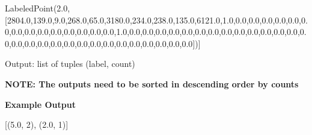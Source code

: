 \documentclass[11pt]{article}
\newenvironment{Shaded}{}{}
\newcommand{\DecValTok}[1]{\textcolor[rgb]{0.25,0.63,0.44}{{#1}}}
\newcommand{\FloatTok}[1]{\textcolor[rgb]{0.25,0.63,0.44}{{#1}}}
\newcommand{\NormalTok}[1]{{#1}}
\begin{document}
\begin{Shaded}
\begin{Highlighting}[]
\NormalTok{ LabeledPoint(}\FloatTok{2.0}\NormalTok{, [}\FloatTok{2804.0}\NormalTok{,}\FloatTok{139.0}\NormalTok{,}\FloatTok{9.0}\NormalTok{,}\FloatTok{268.0}\NormalTok{,}\FloatTok{65.0}\NormalTok{,}\FloatTok{3180.0}\NormalTok{,}\FloatTok{234.0}\NormalTok{,}\FloatTok{238.0}\NormalTok{,}\FloatTok{135.0}\NormalTok{,}\FloatTok{6121.0}\NormalTok{,}\FloatTok{1.0}\NormalTok{,}\FloatTok{0.0}\NormalTok{,}\FloatTok{0.0}\NormalTok{,}\FloatTok{0.0}\NormalTok{,}\FloatTok{0.0}\NormalTok{,}\FloatTok{0.0}\NormalTok{,}\FloatTok{0.0}\NormalTok{,}\FloatTok{0.0}\NormalTok{,}\FloatTok{0.0}\NormalTok{,}\FloatTok{0.0}\NormalTok{,}\FloatTok{0.0}\NormalTok{,}\FloatTok{0.0}\NormalTok{,}\FloatTok{0.0}\NormalTok{,}\FloatTok{0.0}\NormalTok{,}\FloatTok{0.0}\NormalTok{,}\FloatTok{1.0}\NormalTok{,}\FloatTok{0.0}\NormalTok{,}\FloatTok{0.0}\NormalTok{,}\FloatTok{0.0}\NormalTok{,}\FloatTok{0.0}\NormalTok{,}\FloatTok{0.0}\NormalTok{,}\FloatTok{0.0}\NormalTok{,}\FloatTok{0.0}\NormalTok{,}\FloatTok{0.0}\NormalTok{,}\FloatTok{0.0}\NormalTok{,}\FloatTok{0.0}\NormalTok{,}\FloatTok{0.0}\NormalTok{,}\FloatTok{0.0}\NormalTok{,}\FloatTok{0.0}\NormalTok{,}\FloatTok{0.0}\NormalTok{,}\FloatTok{0.0}\NormalTok{,}\FloatTok{0.0}\NormalTok{,}\FloatTok{0.0}\NormalTok{,}\FloatTok{0.0}\NormalTok{,}\FloatTok{0.0}\NormalTok{,}\FloatTok{0.0}\NormalTok{,}\FloatTok{0.0}\NormalTok{,}\FloatTok{0.0}\NormalTok{,}\FloatTok{0.0}\NormalTok{,}\FloatTok{0.0}\NormalTok{,}\FloatTok{0.0}\NormalTok{,}\FloatTok{0.0}\NormalTok{,}\FloatTok{0.0}\NormalTok{,}\FloatTok{0.0}\NormalTok{])]}
\end{Highlighting}
\end{Shaded}

Output: list of tuples (label, count)

\textbf{NOTE: The outputs need to be sorted in descending order by
counts}

\textbf{Example Output}

\begin{Shaded}
\begin{Highlighting}[]
\NormalTok{[(}\FloatTok{5.0}\NormalTok{, }\DecValTok{2}\NormalTok{), (}\FloatTok{2.0}\NormalTok{, }\DecValTok{1}\NormalTok{)]}
\end{Highlighting}
\end{Shaded}
\end{document}

